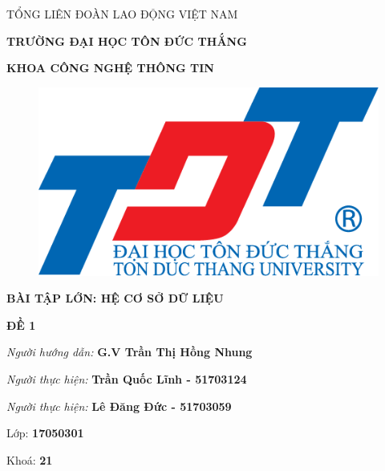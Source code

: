 \documentclass{report}
\begin{document}
\newcommand{\xfill}[2][1ex]{{%
  \dimen0=#2\advance\dimen0 by #1
  \leaders\hrule height \dimen0 depth -#1\hfill%
}}

\changefontsizes[14pt]{12pt}
\centerline{TỔNG LIÊN ĐOÀN LAO ĐỘNG VIỆT NAM}

\changefontsizes[14pt]{11pt}
\centerline{\textbf{TRƯỜNG ĐẠI HỌC TÔN ĐỨC THẮNG}}
\centerline{\textbf{KHOA CÔNG NGHỆ THÔNG TIN}}

\begin{center}
    \begin{figure}[htp]
    \begin{center}
     \includegraphics[scale=.2]{logo}
    \end{center}
    \end{figure}
\end{center}

\changefontsizes{16pt}
\centerline{\textbf{BÀI TẬP LỚN: HỆ CƠ SỞ DỮ LIỆU}}
\vspace{1.5cm}
\changefontsizes{24pt}
\centerline{\textbf{ĐỀ 1}}

\vspace{4cm}
\begin{flushright}
\renewcommand{\baselinestretch}{0.05}
\changefontsizes{14pt}
\textit{Người hướng dẫn: }\textbf{G.V Trần Thị Hồng Nhung}
\setlength{\parskip}{0.5em}

\textit{Người thực hiện: }\textbf{Trần Quốc Lĩnh - 51703124}
\setlength{\parskip}{0.5em}

\textit{Người thực hiện: }\textbf{Lê Đăng Đức - 51703059}
\setlength{\parskip}{0.5em}

Lớp: \textbf{17050301}
\setlength{\parskip}{0.5em}

Khoá: \textbf{21}
\setlength{\parskip}{0.5em}

\end{flushright}
\end{document}

